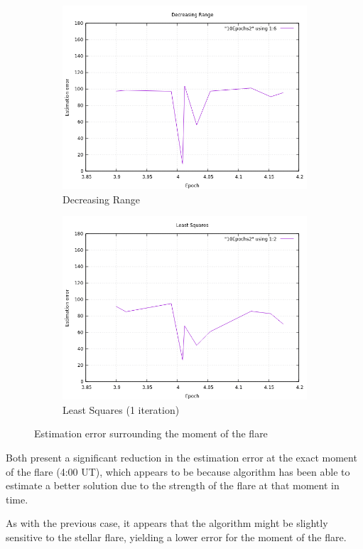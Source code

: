 \begin{figure}[!htb]
	\begin{subfigure}[b]{0.5\textwidth}
		\includegraphics[width=\linewidth]{images/resultsStellar/DR2Epochs.png}
		\caption{Decreasing Range}
	\end{subfigure}
	\hfill
	\begin{subfigure}[b]{0.5\textwidth}
		\includegraphics[width=\linewidth]{images/resultsStellar/LS2Epochs.png}
		\caption{Least Squares (1 iteration)}
	\end{subfigure}
	\caption{Estimation error surrounding the moment of the flare}
	\label{fig:stellar2Epochs10}
\end{figure}

Both present a significant reduction in the estimation error at the exact moment of the flare (4:00 UT), which appears to be because algorithm has been able to estimate a better solution due to the strength of the flare at that moment in time.

As with the previous case, it appears that the algorithm might be slightly sensitive to the stellar flare, yielding a lower error for the moment of the flare.




